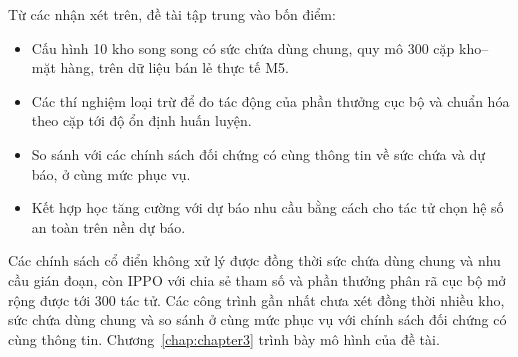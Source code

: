 Từ các nhận xét trên, đề tài tập trung vào bốn điểm:
\begin{itemize}
    \item Cấu hình 10 kho song song có sức chứa dùng chung, quy mô 300 cặp kho--mặt hàng, trên dữ liệu bán lẻ thực tế M5.
    \item Các thí nghiệm loại trừ để đo tác động của phần thưởng cục bộ và chuẩn hóa theo cặp tới độ ổn định huấn luyện.
    \item So sánh với các chính sách đối chứng có cùng thông tin về sức chứa và dự báo, ở cùng mức phục vụ.
    \item Kết hợp học tăng cường với dự báo nhu cầu bằng cách cho tác tử chọn hệ số an toàn trên nền dự báo.
\end{itemize}

\FloatBarrier
Các chính sách cổ điển không xử lý được đồng thời sức chứa dùng chung và nhu cầu gián đoạn, còn IPPO với chia sẻ tham số và phần thưởng phân rã cục bộ mở rộng được tới 300 tác tử. Các công trình gần nhất chưa xét đồng thời nhiều kho, sức chứa dùng chung và so sánh ở cùng mức phục vụ với chính sách đối chứng có cùng thông tin. Chương~\ref{chap:chapter3} trình bày mô hình của đề tài.
